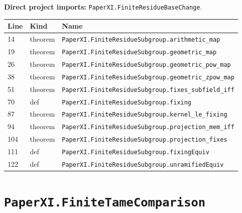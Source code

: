 \documentclass[10pt,oneside]{book}
\begin{document}

\textbf{Direct project imports:} \nolinkurl{PaperXI.FiniteResidueBaseChange}.

\begin{longtable}{@{}p{}p{}p{}@{}}\toprule Line&Kind&Name\\\midrule\endhead

14&theorem&\nolinkurl{PaperXI.FiniteResidueSubgroup.arithmetic_map}\\

19&theorem&\nolinkurl{PaperXI.FiniteResidueSubgroup.geometric_map}\\

26&theorem&\nolinkurl{PaperXI.FiniteResidueSubgroup.geometric_pow_map}\\

38&theorem&\nolinkurl{PaperXI.FiniteResidueSubgroup.geometric_zpow_map}\\

51&theorem&\nolinkurl{PaperXI.FiniteResidueSubgroup.fixes_subfield_iff}\\

70&def&\nolinkurl{PaperXI.FiniteResidueSubgroup.fixing}\\

87&theorem&\nolinkurl{PaperXI.FiniteResidueSubgroup.kernel_le_fixing}\\

94&theorem&\nolinkurl{PaperXI.FiniteResidueSubgroup.projection_mem_iff}\\

104&theorem&\nolinkurl{PaperXI.FiniteResidueSubgroup.projection_fixes}\\

111&def&\nolinkurl{PaperXI.FiniteResidueSubgroup.fixingEquiv}\\

122&def&\nolinkurl{PaperXI.FiniteResidueSubgroup.unramifiedEquiv}\\

\bottomrule\end{longtable}

\section{\texorpdfstring{\nolinkurl{PaperXI.FiniteTameComparison}}{PaperXI.FiniteTameComparison}}\label{module:PaperXI.FiniteTameComparison}
\end{document}
